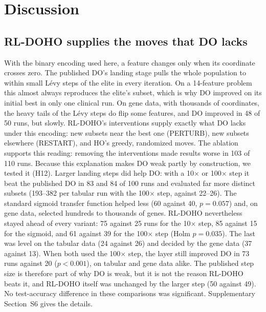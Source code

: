 \documentclass[journal]{IEEEtran}
\begin{document}
\section{Discussion}\label{sec:discussion}

\subsection{RL-DOHO supplies the moves that DO lacks}
With the binary encoding used here, a feature changes only when its coordinate crosses zero. The published DO's landing stage pulls the whole population to within small Lévy steps of the elite in every iteration. On a 14-feature problem this almost always reproduces the elite's subset, which is why DO improved on its initial best in only one clinical run. On gene data, with thousands of coordinates, the heavy tails of the Lévy steps do flip some features, and DO improved in 48 of 50 runs, but slowly. RL-DOHO's interventions supply exactly what DO lacks under this encoding: new subsets near the best one (PERTURB), new subsets elsewhere (RESTART), and HO's greedy, randomized moves. The ablation supports this reading: removing the interventions made results worse in 103 of 110 runs. Because this explanation makes DO weak partly by construction, we tested it (H12). Larger landing steps did help DO: with a 10$\times$ or 100$\times$ step it beat the published DO in 83 and 84 of 100 runs and evaluated far more distinct subsets (193--382 per tabular run with the 100$\times$ step, against 22--26). The standard sigmoid transfer function helped less (60 against 40, $p=0.057$) and, on gene data, selected hundreds to thousands of genes. RL-DOHO nevertheless stayed ahead of every variant: 75 against 25 runs for the 10$\times$ step, 85 against 15 for the sigmoid, and 61 against 39 for the 100$\times$ step (Holm $p=0.035$). The last was level on the tabular data (24 against 26) and decided by the gene data (37 against 13). When both used the 100$\times$ step, the layer still improved DO in 73 runs against 20 ($p<0.001$), on tabular and gene data alike. The published step size is therefore part of why DO is weak, but it is not the reason RL-DOHO beats it, and RL-DOHO itself was unchanged by the larger step (50 against 49). No test-accuracy difference in these comparisons was significant. Supplementary Section~S6 gives the details.
\end{document}
